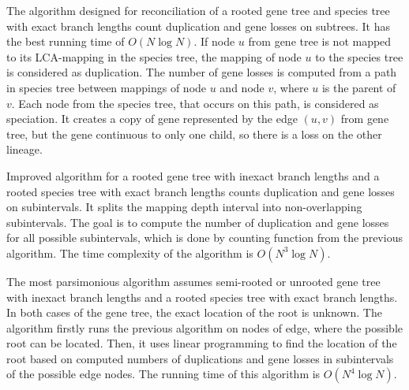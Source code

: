 The algorithm designed for reconciliation of a rooted gene tree and species tree with exact branch lengths count duplication and gene losses on subtrees. It has the best running time of $O(N \log N)$. If node $u$ from gene tree is not mapped to its LCA-mapping in the species tree, the mapping of node $u$ to the species tree is considered as duplication. The number of gene losses is computed from a path in species tree between mappings of node $u$ and node $v$, where $u$ is the parent of $v$. Each node from the species tree, that occurs on this path, is considered as speciation. It creates a copy of gene represented by the edge $(u, v)$ from gene tree, but the gene continuous to only one child, so there is a loss on the other lineage.

Improved algorithm for a rooted gene tree with inexact branch lengths and a rooted species tree with exact branch lengths counts duplication and gene losses on subintervals. It splits the mapping depth interval into non-overlapping subintervals. The goal is to compute the number of duplication and gene losses for all possible subintervals, which is done by counting function from the previous algorithm. The time complexity of the algorithm is $O(N^3 \log N)$.

The most parsimonious algorithm assumes semi-rooted or unrooted gene tree with inexact branch lengths and a rooted species tree with exact branch lengths. In both cases of the gene tree, the exact location of the root is unknown. The algorithm firstly runs the previous algorithm on nodes of edge, where the possible root can be located. Then, it uses linear programming to find the location of the root based on computed numbers of duplications and gene losses in subintervals of the possible edge nodes. The running time of this algorithm is $O(N^4 \log N)$.












